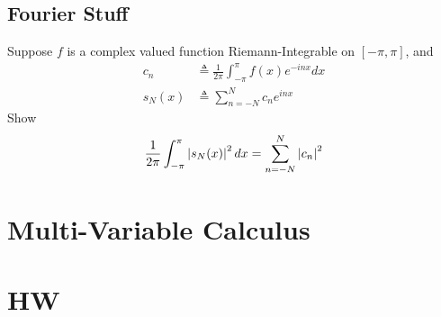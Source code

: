 \documentclass{report}
\begin{document}
\section{Fourier Stuff}
\begin{mdframed}
Suppose $f$ is a complex valued function Riemann-Integrable on  $[-\pi,\pi]$, and 
\begin{align*}
  c_n&\triangleq \frac{1}{2\pi}\int_{-\pi}^{\pi} f(x)e^{-inx}dx\\
s_N(x)&\triangleq \sum_{n=-N}^{N} c_ne^{inx} 
\end{align*}
Show 
\begin{align*}
\frac{1}{2\pi}\int_{-\pi}^{\pi} \left|s_N(x)\right|^2dx=\sum_{n=-N}^{N}\left|c_n\right|^2
\end{align*}
\end{mdframed}



\chapter{Multi-Variable Calculus}
\section{}
\chapter{HW}
\end{document}
